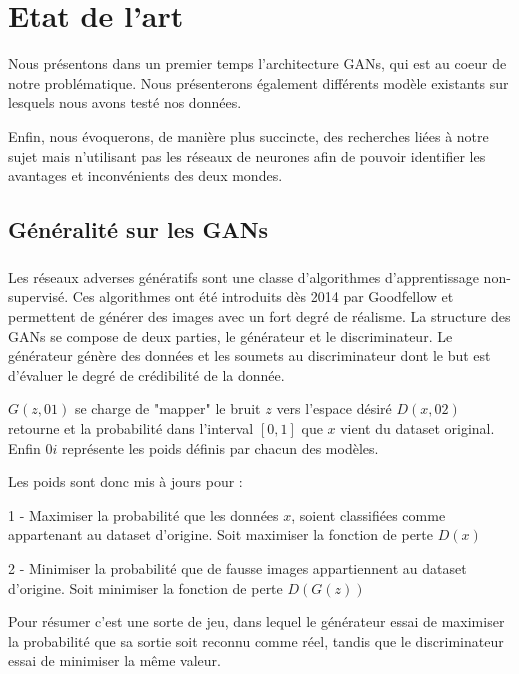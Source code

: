 \documentclass[a4paper, 12pt]{book}
\begin{document}
\chapter{Etat de l'art}
 
Nous présentons dans un premier temps l'architecture GANs, qui est au coeur de notre problématique. Nous présenterons également différents modèle existants sur lesquels nous avons testé nos données.

Enfin, nous évoquerons, de manière plus succincte, des recherches liées à notre sujet mais n'utilisant pas les réseaux de neurones afin de pouvoir identifier les avantages et inconvénients des deux mondes. 


\section{Généralité sur les GANs}

\paragraph{}
Les réseaux adverses génératifs sont une classe d'algorithmes d'apprentissage non-supervisé. Ces algorithmes ont été introduits dès 2014 par Goodfellow \cite{goodfellow2014generative} et permettent de générer des images avec un fort degré de réalisme. La structure des GANs se compose de deux parties, le générateur et le discriminateur. Le générateur génère des données et les soumets au discriminateur dont le but est d'évaluer le degré de crédibilité de la donnée. 


$G(z, 01)$ se charge de "mapper" le bruit $z$ vers l'espace désiré
$D(x, 02)$ retourne et la probabilité dans l'interval $[0,1]$ que $x$ vient du dataset original. Enfin $0i$ représente les poids définis par chacun des modèles.

Les poids sont donc mis à jours pour : 

1 - Maximiser la probabilité que les données $x$, soient classifiées comme appartenant au dataset d'origine. Soit maximiser la fonction de perte $D(x)$

2 - Minimiser la probabilité que de fausse images appartiennent au dataset d'origine. Soit minimiser la fonction de perte $D(G(z))$


Pour résumer c'est une sorte de jeu, dans lequel le générateur essai de maximiser la probabilité que sa sortie soit reconnu comme réel, tandis que le discriminateur essai de minimiser la même valeur.
\end{document}
